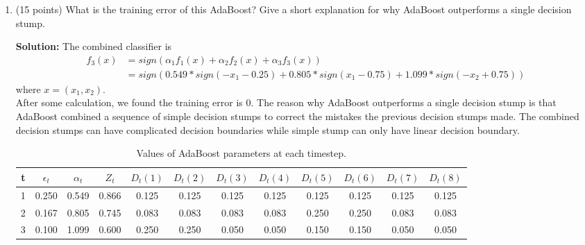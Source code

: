 \documentclass[twoside,10pt]{article}
\begin{document}
\begin{enumerate}
\begin{enumerate}
\begin{tcolorbox}
\begin{itemize}
\end{itemize}
\end{tcolorbox}
\newpage
\item (15 points) What is the training error of this AdaBoost? Give a short explanation for why AdaBoost outperforms a single decision stump.
\begin{tcolorbox}
\textbf{Solution:} The combined classifier is 
\begin{align*}
f_3(x) &= sign(\alpha_1 f_1(x) + \alpha_2 f_2(x) + \alpha_3 f_3(x)) \\
& = sign(0.549 * sign(-x_1 - 0.25) + 0.805 * sign(x_1 - 0.75) + 1.099 * sign(-x_2 + 0.75))
\end{align*}
where $x = (x_1, x_2)$. \\

After some calculation, we found the training error is $0$. The reason why AdaBoost outperforms a single decision stump is that AdaBoost combined a sequence of simple decision stumps to correct the mistakes the previous decision stumps made. The combined decision stumps can have complicated decision boundaries while simple stump can only have linear decision boundary.  

\end{tcolorbox}
\begin{table}
\begin{center}
\caption{Values of AdaBoost parameters at each timestep.}
\vspace{0.1in}
\begin{tabular}{|c|c|c|c|c|c|c|c|c|c|c|c|}\hline
t & $\epsilon_t$ & $\alpha_t$ & $Z_t$ & $D_t(1)$ & $D_t(2)$ & $D_t(3)$ & $D_t(4)$ & $D_t(5)$ & $D_t(6)$ & $D_t(7)$ & $D_t(8)$ \\\hline
1 & 0.250 & 0.549 & 0.866 &0.125 &0.125 &0.125 &0.125 & 0.125&0.125 &0.125 & 0.125\\
2 & 0.167 & 0.805 & 0.745 & 0.083 & 0.083 & 0.083 & 0.083 & 0.250 & 0.250 & 0.083 & 0.083 \\
3 & 0.100 & 1.099 & 0.600 & 0.250 & 0.250 & 0.050 & 0.050 & 0.150 & 0.150 & 0.050 & 0.050 \\\hline
\end{tabular}
\end{center}
\end{table}


\end{enumerate}
\end{enumerate}
\end{document}
